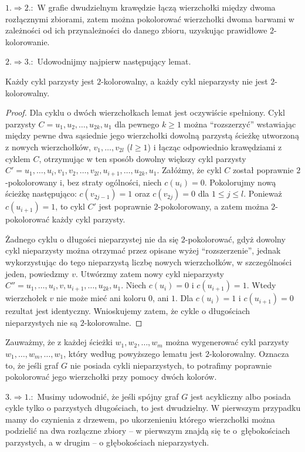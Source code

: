 $1.\Rightarrow 2.\!\!:$ W grafie dwudzielnym krawędzie łączą wierzchołki między dwoma rozłącznymi zbiorami, zatem można pokolorować wierzchołki dwoma barwami w zależności od ich przynależności do danego zbioru, uzyskując prawidłowe \mbox{$2$-kolorowanie}.
\bigskip

$2.\Rightarrow 3.\!\!:$ Udowodnijmy najpierw następujący lemat.
\begin{lemat*}
	Każdy cykl parzysty jest $2$-kolorowalny, a każdy cykl nieparzysty nie jest $2$-kolorowalny.
\end{lemat*}
\begin{proof}
Dla cyklu o dwóch wierzchołkach lemat jest oczywiście spełniony. Cykl parzysty $C = u_1,u_2,\dots,u_{2k},u_1$ dla pewnego $k\ge 1$ można ``rozszerzyć'' wstawiając między pewne dwa sąsiednie jego wierzchołki dowolną parzystą ścieżkę utworzoną z nowych wierzchołków, $v_1,\dots,v_{2l}$ ($l\ge 1$) i łącząc odpowiednio krawędziami z cyklem $C$, otrzymując w ten sposób dowolny większy cykl parzysty $C' = u_1,\dots,u_i,v_1,v_2,\dots,v_{2l},u_{i+1},\dots,u_{2k},u_1$. Załóżmy, że cykl $C$ został poprawnie \mbox{$2$-pokolorowany} i, bez straty ogólności, niech $c(u_i)=0$. Pokolorujmy nową ścieżkę następująco: $c(v_{2j-1})=1$ oraz $c(v_{2j})=0$ dla $1\le j\le l$. Ponieważ $c(u_{i+1})=1$, to cykl $C'$ jest poprawnie $2$-pokolorowany, a zatem można $2$-pokolorować każdy cykl parzysty.

Żadnego cyklu o długości nieparzystej nie da się $2$-pokolorować, gdyż dowolny cykl nieparzysty można otrzymać przez opisane wyżej ``rozszerzenie'', jednak wykorzystując do tego nieparzystą liczbę nowych wierzchołków, w szczególności jeden, powiedzmy $v$. Utwórzmy zatem nowy cykl nieparzysty $C'' = u_1,\dots,u_i,v,u_{i+1},\dots,u_{2k},u_1$. Niech $c(u_i)=0$ i $c(u_{i+1})=1$. Wtedy wierzchołek $v$ nie może mieć ani koloru $0$, ani $1$. Dla $c(u_i)=1$ i $c(u_{i+1})=0$ rezultat jest identyczny. Wnioskujemy zatem, że cykle o długościach nieparzystych nie są $2$-kolorowalne.
\end{proof}

Zauważmy, że z każdej ścieżki $w_1,w_2,\dots,w_m$ można wygenerować cykl parzysty $w_1,\dots,w_m,\dots,w_1$, który według powyższego lematu jest $2$-kolorowalny. Oznacza to, że jeśli graf $G$ nie posiada cykli nieparzystych, to potrafimy poprawnie pokolorować jego wierzchołki przy pomocy dwóch kolorów.
\bigskip

$3.\Rightarrow 1.\!\!:$ Musimy udowodnić, że jeśli spójny graf $G$ jest acykliczny albo posiada cykle tylko o parzystych długościach, to jest dwudzielny. W pierwszym przypadku mamy do czynienia z drzewem, po ukorzenieniu którego wierzchołki można podzielić na dwa rozłączne zbiory -- w pierwszym znajdą się te o~głębokościach parzystych, a w drugim -- o głębokościach nieparzystych.

